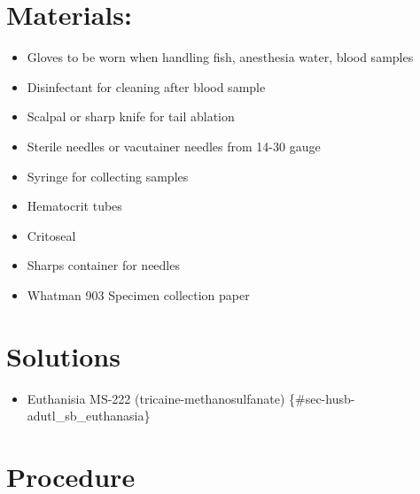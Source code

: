 \documentclass[
  letterpaper,
  DIV=11,
  numbers=noendperiod]{scrreprt}
\providecommand{\tightlist}{%
  \setlength{\itemsep}{0pt}\setlength{\parskip}{0pt}}\usepackage{longtable,booktabs,array}
\begin{document}
\hypertarget{materials}{%
\section{Materials:}\label{materials}}

\begin{itemize}
\tightlist
\item
  Gloves to be worn when handling fish, anesthesia water, blood samples
\item
  Disinfectant for cleaning after blood sample
\item
  Scalpal or sharp knife for tail ablation
\item
  Sterile needles or vacutainer needles from 14-30 gauge
\item
  Syringe for collecting samples
\item
  Hematocrit tubes
\item
  Critoseal
\item
  Sharps container for needles
\item
  Whatman 903 Specimen collection paper
\end{itemize}

\hypertarget{solutions-57}{%
\section{Solutions}\label{solutions-57}}

\begin{itemize}
\tightlist
\item
  Euthanisia MS-222 (tricaine-methanosulfanate)
  \{\#sec-husb-adutl\_sb\_euthanasia\}
\end{itemize}

\hypertarget{procedure-64}{%
\section{Procedure}\label{procedure-64}}
\end{document}
